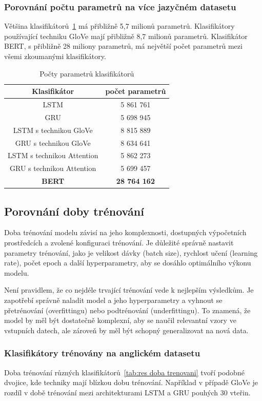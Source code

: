 \subsubsection{Porovnání počtu parametrů na více jazyčném datasetu}
Většina klasifikátorů~\ref{tab:MULTI res pocet parametru} má přibližně 5,7 milionů parametrů.
Klasifikátory používající techniku GloVe mají přibližně 8,7 milionů parametrů.
Klasifikátor BERT, s přibližně 28 miliony parametrů, má největší počet parametrů mezi všemi zkoumanými klasifikátory.

\begin{table}[H]
	\centering
	\caption{Počty parametrů klasifikátorů}\label{tab:MULTI res pocet parametru}
	\begin{tabular}{ c c }
			\toprule
			Klasifikátor & počet parametrů\\
			\midrule
			LSTM & 5 861 761\\
			GRU & 5 698 945\\         
			LSTM s technikou GloVe & 8 815 889\\         
			GRU s technikou GloVe & 8 634 641\\         
			LSTM s technikou Attention & 5 862 273\\         
			GRU s technikou Attention & 5 699 457\\      
			\textbf{BERT} & \textbf{28 764 162}\\         
			\midrule
		\end{tabular}
\end{table}

\subsection{Porovnání doby trénování}
Doba trénování modelu závisí na jeho komplexnosti, dostupných výpočetních prostředcích a zvolené konfiguraci trénování.
Je důležité správně nastavit parametry trénování, jako je velikost dávky (batch size), rychlost učení (learning rate), počet epoch a další hyperparametry, aby se dosáhlo optimálního výkonu modelu.

Není pravidlem, že co nejdéle trvající trénování vede k nejlepším výsledkům.
Je zapotřebí správně naladit model a jeho hyperparametry a vyhnout se přetrénování (overfittingu) nebo podtrénování (underfittingu).
To znamená, že model by měl být dostatečně komplexní, aby se naučil relevantní vzory ve vstupních datech, ale zároveň by měl být schopný generalizovat na nová data.

\subsubsection{Klasifikátory trénovány na anglickém datasetu}\label{subsec:EN cas}
Doba trénování různých klasifikátorů~\ref{tab:res doba trenovani} tvoří podobné dvojice, kde techniky mají blízkou dobu trénování.
Například v případě GloVe je rozdíl v době trénování mezi architekturami LSTM a GRU pouhých 30 vteřin.

